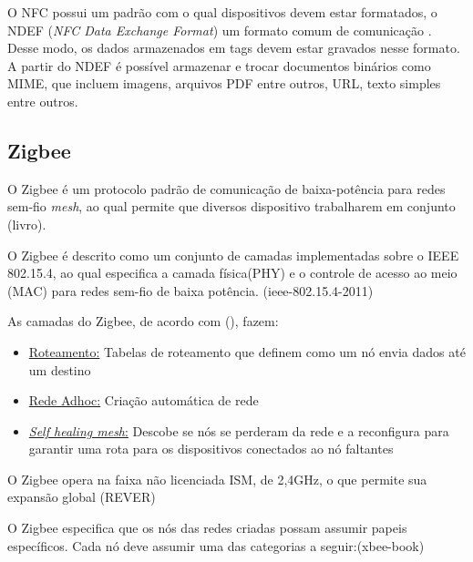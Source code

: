 \documentclass[
	article,			%
	11pt,				%
	oneside,			%
	a4paper,			%
	section=TITLE,		%
	subsection=TITLE,	%
	english,			%
	brazil,				%
	sumario=tradicional
	]{abntex2}
\begin{document}
O NFC possui um padrão com o qual dispositivos devem estar formatados, o NDEF (\textit{NFC Data 
Exchange Format}) um formato comum de comunicação \cite{brianjepsondoncolemantomigoe2014}. Desse 
modo, os dados 
armazenados em tags devem estar gravados nesse formato. A partir do NDEF é possível 
armazenar e trocar documentos binários como MIME, que incluem imagens, arquivos PDF entre outros, 
URL, texto simples entre outros.







\subsection{Zigbee}

O Zigbee é um protocolo padrão de comunicação de baixa-potência para redes sem-fio \textit{mesh}, 
ao qual permite que diversos dispositivo trabalharem em conjunto (livro).

O Zigbee é descrito como um conjunto de camadas implementadas sobre o IEEE 802.15.4, ao qual 
especifica a camada física(PHY) e o controle de acesso ao meio (MAC) para 
redes sem-fio de baixa potência. (ieee-802.15.4-2011) 

As camadas do Zigbee, de acordo com (), fazem:

\begin{itemize} \parskip -4pt
	\item \underline{Roteamento:} Tabelas de roteamento que definem como um nó envia dados até um 
	destino
	\item \underline{Rede Adhoc:} Criação automática de rede
	\item \underline{\textit{Self healing mesh}:} Descobe se nós se perderam da rede e a 
	reconfigura para garantir uma rota para os dispositivos conectados ao nó faltantes
\end{itemize}

O Zigbee opera na faixa não licenciada ISM, de 2,4GHz, o que permite sua expansão global (REVER)

O Zigbee especifica que os nós das redes criadas possam assumir papeis específicos. Cada nó deve 
assumir uma das categorias a seguir:(xbee-book)
\end{document}
